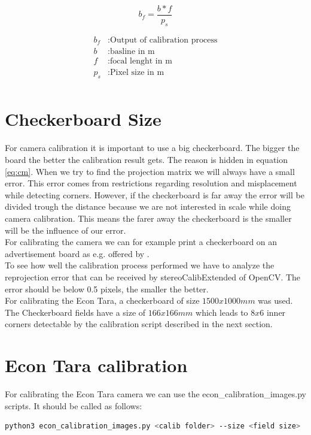 \documentclass[11pt,a4paper,titlepage,oneside]{report}
\begin{document}
\begin{equation}\label{eq:bf}
	b_f=\frac{b*f}{p_s}
\end{equation}

\begin{align*}
	b_f &:	\text{Output of calibration process}\\
	b &:		\text{basline in m}\\
	f &:		\text{focal lenght in m}\\
	p_s &:	\text{Pixel size in m}\\
\end{align*}

\section{Checkerboard Size}

For camera calibration it is important to use a big checkerboard. The bigger the board the better the calibration result gets. The reason is hidden in equation \ref{eq:cm}. When we try to find the projection matrix we will always have a small error. This error comes from restrictions regarding resolution and misplacement while detecting corners. However, if the checkerboard is far away the error will be divided trough the distance because we are not interested in scale while doing camera calibration. This means the farer away the checkerboard is the smaller will be the influence of our error.\\
For calibrating the camera we can for example print a checkerboard on an advertisement board as e.g. offered by \cite{mydisplay}.\\
To see how well the calibration process performed we have to analyze the reprojection error that can be received by stereoCalibExtended of OpenCV. The error should be below 0.5 pixels, the smaller the better.\\
For calibrating the Econ Tara, a checkerboard of size $1500x1000mm$ was used. The Checkerboard fields have a size of $166x166mm$ which leads to $8x6$ inner corners detectable by the calibration script described in the next section.

\section{Econ Tara calibration}
For calibrating the Econ Tara camera we can use the econ\_calibration\_images.py scripts. It should be called as follows:
\begin{lstlisting}[language=bash]
python3 econ_calibration_images.py <calib folder> --size <field size>
\end{lstlisting}
\end{document}
